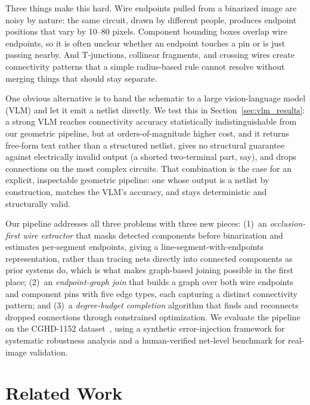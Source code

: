 \documentclass[journal]{IEEEtran}
\begin{document}
Three things make this hard. Wire endpoints pulled from a binarized image are noisy by nature: the same circuit, drawn by different people, produces endpoint positions that vary by 10--80 pixels. Component bounding boxes overlap wire endpoints, so it is often unclear whether an endpoint touches a pin or is just passing nearby. And T-junctions, collinear fragments, and crossing wires create connectivity patterns that a simple radius-based rule cannot resolve without merging things that should stay separate.

One obvious alternative is to hand the schematic to a large vision-language model (VLM) and let it emit a netlist directly. We test this in Section~\ref{sec:vlm_results}: a strong VLM reaches connectivity accuracy statistically indistinguishable from our geometric pipeline, but at orders-of-magnitude higher cost, and it returns free-form text rather than a structured netlist, gives no structural guarantee against electrically invalid output (a shorted two-terminal part, say), and drops connections on the most complex circuits. That combination is the case for an explicit, inspectable geometric pipeline: one whose output is a netlist by construction, matches the VLM's accuracy, and stays deterministic and structurally valid.

Our pipeline addresses all three problems with three new pieces: (1)~an \emph{occlusion-first wire extractor} that masks detected components before binarization and estimates per-segment endpoints, giving a line-segment-with-endpoints representation, rather than tracing nets directly into connected components as prior systems do, which is what makes graph-based joining possible in the first place; (2)~an \emph{endpoint-graph join} that builds a graph over both wire endpoints and component pins with five edge types, each capturing a distinct connectivity pattern; and (3)~a \emph{degree-budget completion} algorithm that finds and reconnects dropped connections through constrained optimization. We evaluate the pipeline on the CGHD-1152 dataset~\cite{bayer2021cghd}, using a synthetic error-injection framework for systematic robustness analysis and a human-verified net-level benchmark for real-image validation.

\section{Related Work}
\end{document}
